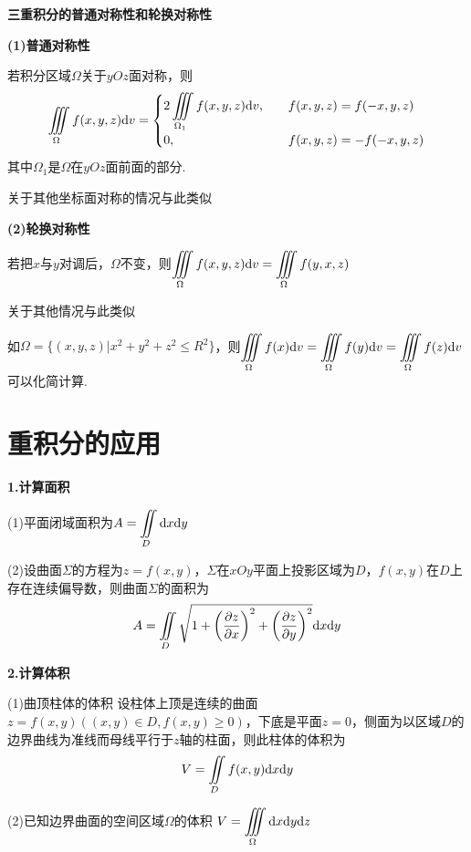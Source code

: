 \textbf{三重积分的普通对称性和轮换对称性}

\textbf{(1)普通对称性}

若积分区域$\Omega$关于$yOz$面对称，则
\begin{equation*}
    \iiint \limits_{\Omega} f(x,y,z)\mathrm{d} v=
    \begin{cases}
        2\displaystyle\iiint \limits_{\Omega_1} f(x,y,z)\mathrm{d} v, \quad & f(x,y,z)=f(-x,y,z) \\
        0,  & f(x,y,z)=-f(-x,y,z)
    \end{cases}
\end{equation*}
其中$\Omega_1$是$\Omega$在$yOz$面前面的部分.

关于其他坐标面对称的情况与此类似

\textbf{(2)轮换对称性}

若把$x$与$y$对调后，$\Omega$不变，则$\displaystyle\iiint\limits_{\Omega}f(x,y,z)\mathrm{d} v=\iiint\limits_{\Omega}f(y,x,z)$

关于其他情况与此类似

如$\Omega=\{(x,y,z)|x^2+y^2+z^2\leq R^2\}$，则$\displaystyle\iiint\limits_{\Omega}f(x)\mathrm{d} v=\iiint\limits_{\Omega}f(y)\mathrm{d} v=\iiint\limits_{\Omega}f(z)\mathrm{d} v$可以化简计算.

\section{重积分的应用}

\textbf{1.计算面积}

(1)平面闭域面积为$\displaystyle A=\iint \limits_{D} \mathrm{d} x\mathrm{d} y$

(2)设曲面$\Sigma$的方程为$z=f(x,y)$，$\Sigma$在$xOy$平面上投影区域为$D$，$f(x,y)$在$D$上存在连续偏导数，则曲面$\Sigma$的面积为
\begin{equation*}
    A=\iint \limits_{D} \sqrt{1+\left(\dfrac{\partial z}{\partial x}\right)^2+\left(\dfrac{\partial z}{\partial y}\right)^2}\mathrm{d} x\mathrm{d} y
\end{equation*}

\textbf{2.计算体积}

(1)曲顶柱体的体积 \quad 设柱体上顶是连续的曲面$z=f(x,y)((x,y)\in D,f(x,y)\geq 0)$，下底是平面$z=0$，侧面为以区域$D$的边界曲线为准线而母线平行于$z$轴的柱面，则此柱体的体积为
\begin{equation*}
    V=\iint \limits_{D} f(x,y)\mathrm{d} x\mathrm{d} y
\end{equation*}

(2)已知边界曲面的空间区域$\Omega$的体积 \quad $V=\displaystyle\iiint \limits_{\Omega}\mathrm{d} x\mathrm{d} y\mathrm{d} z$